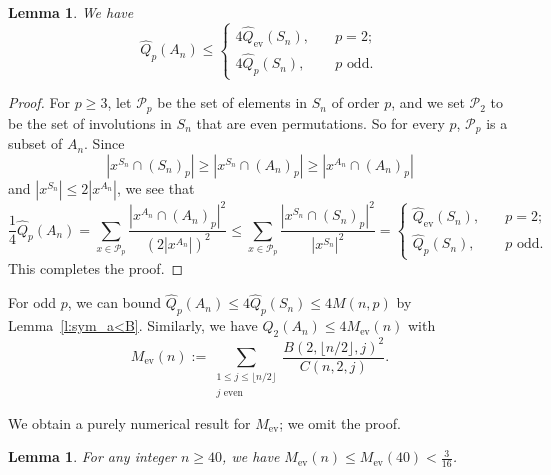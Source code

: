 \documentclass[11pt]{amsart}
\numberwithin{equation}{section}
\newtheorem{lemma}[theorem]{Lemma}
\theoremstyle{definition}
\theoremstyle{remark}
\begin{document}
\begin{lemma}\label{l:alt_4}
    We have
    \begin{equation*}
        \widehat{Q}_p(A_n) \leqslant
        \begin{cases}
            4\widehat{Q}_{\mathrm{ev}}(S_n), \quad &p = 2;\\
            4\widehat{Q}_p(S_n),\quad & \mbox{$p$ odd.}
        \end{cases}
    \end{equation*}
\end{lemma}

\begin{proof}
    For $p\geqslant 3$, let $\mathcal{P}_p$ be the set of elements in $S_n$ of order $p$, and we set $\mathcal{P}_2$ to be the set of involutions in $S_n$ that are even permutations. So for every $p$, $\mathcal{P}_p$ is a subset of $A_n$. Since
    \begin{equation*}
        |x^{S_n}\cap (S_n)_p| \geqslant |x^{S_n} \cap (A_n)_p| \geqslant |x^{A_n} \cap (A_n)_p|
    \end{equation*}
    and $|x^{S_n}| \leqslant 2|x^{A_n}|$, we see that
    \begin{equation*}
        \frac{1}{4}\widehat{Q}_p(A_n) = \sum_{x\in\mathcal{P}_p} \frac{|x^{A_n}\cap (A_n)_p|^2}{(2|x^{A_n}|)^2} \leqslant \sum_{x\in\mathcal{P}_p} \frac{|x^{S_n}\cap (S_n)_p|^2}{|x^{S_n}|^2} = 
        \begin{cases}
            \widehat{Q}_{\mathrm{ev}}(S_n), \quad &p = 2;\\
            \widehat{Q}_p(S_n),\quad & \mbox{$p$ odd.}
        \end{cases}
    \end{equation*}
    This completes the proof.
\end{proof}

For odd $p$, we can bound $\widehat{Q}_p(A_n) \leqslant 4\widehat{Q}_p(S_n) \leqslant 4M(n,p)$ by Lemma~\ref{l:sym_a<B}. Similarly, we have $\widehat{Q}_2(A_n)\leqslant 4M_{\mathrm{ev}}(n)$ with
\begin{equation*}
    M_{\mathrm{ev}}(n):= \sum_{\substack{1\leqslant j \leqslant\lfloor n/2\rfloor\\ \mbox{$j$ even}}} \frac{B(2,\lfloor n/2 \rfloor,j)^2}{C(n,2,j)}.
\end{equation*}

We obtain a purely numerical result for $M_{\mathrm{ev}}$; we omit the proof.

\begin{lemma}\label{l:alt_ev}
    For any integer $n \geq 40$,
    we have $M_{\mathrm{ev}}(n) \leqslant M_{\mathrm{ev}}(40) <\frac{3}{16}$. 
\end{lemma}
\end{document}

